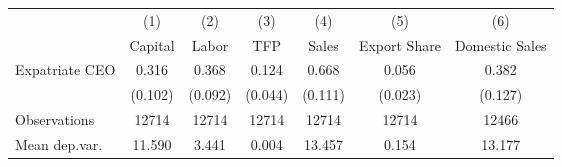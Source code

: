 \begin{tabular}{l*{6}{c}}
\hline\hline
                    &\multicolumn{1}{c}{(1)}&\multicolumn{1}{c}{(2)}&\multicolumn{1}{c}{(3)}&\multicolumn{1}{c}{(4)}&\multicolumn{1}{c}{(5)}&\multicolumn{1}{c}{(6)}\\
                    &\multicolumn{1}{c}{Capital}&\multicolumn{1}{c}{Labor}&\multicolumn{1}{c}{TFP}&\multicolumn{1}{c}{Sales}&\multicolumn{1}{c}{Export Share}&\multicolumn{1}{c}{Domestic Sales}\\
\hline
Expatriate CEO      &       0.316&       0.368&       0.124&       0.668&       0.056&       0.382\\
                    &     (0.102)&     (0.092)&     (0.044)&     (0.111)&     (0.023)&     (0.127)\\
\hline
Observations        &       12714&       12714&       12714&       12714&       12714&       12466\\
Mean dep.var.       &      11.590&       3.441&       0.004&      13.457&       0.154&      13.177\\
\hline\hline
\end{tabular}
